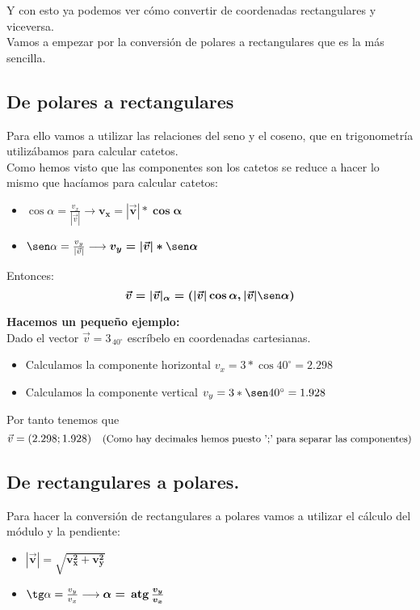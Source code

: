 \documentclass[a4paper,11pt,answers]{exam}
\newcommand{\atg}{\,\mathrm{atg}\,}
\newcommand{\degree}{^\circ}
\begin{document}
Y con esto ya podemos ver cómo convertir de coordenadas rectangulares y viceversa.\\

Vamos a empezar por la conversión de polares a rectangulares que es la más sencilla.
\subsection{De polares a rectangulares}
Para ello vamos a utilizar las relaciones del seno y el coseno, que en trigonometría
utilizábamos para calcular catetos.\\
Como hemos visto que las componentes son los catetos se reduce a hacer lo mismo que hacíamos para
calcular catetos:
\begin{itemize}
\item $\cos \alpha = \frac{v_x}{|\vec{v}|} \longrightarrow \boldsymbol{v_x = |\vec{v}|*\cos \alpha}$
\item $\sen \alpha = \frac{v_y}{|\vec{v}|} \longrightarrow \boldsymbol{v_y = |\vec{v}|*\sen \alpha}$
\end{itemize}
Entonces:
\[\boldsymbol{\vec{v} = |\vec{v}|_\alpha = \left(|\vec{v}|\cos \alpha, |\vec{v}|\sen \alpha\right)}\]

\textbf{Hacemos un pequeño ejemplo:}\\
Dado el vector $\vec{v} = 3_{\,40\degree}$ escríbelo en coordenadas cartesianas.
\begin{solution}
  \begin{itemize}
  \item Calculamos la componente horizontal $v_x = 3*\cos 40\degree = 2.298$
  \item Calculamos la componente vertical $v_y =3*\sen 40\degree = 1.928$
  \end{itemize}
  Por tanto tenemos que
  \[\vec{v} = (2.298;1.928)\quad\text{\small{(Como hay decimales hemos puesto ';' para
      separar las componentes)}}\]
\end{solution}

\subsection{De rectangulares a polares.}
Para hacer la conversión de rectangulares a polares vamos a utilizar el cálculo del módulo y la
pendiente:
\begin{itemize}
\item $\boldsymbol{|\vec{v}| = \sqrt{v_x^2 + v_y^2}}$
\item $\tg \alpha = \frac{v_y}{v_x} \longrightarrow \boldsymbol{\alpha = \atg \frac{v_y}{v_x}}$
\end{itemize}
\end{document}
